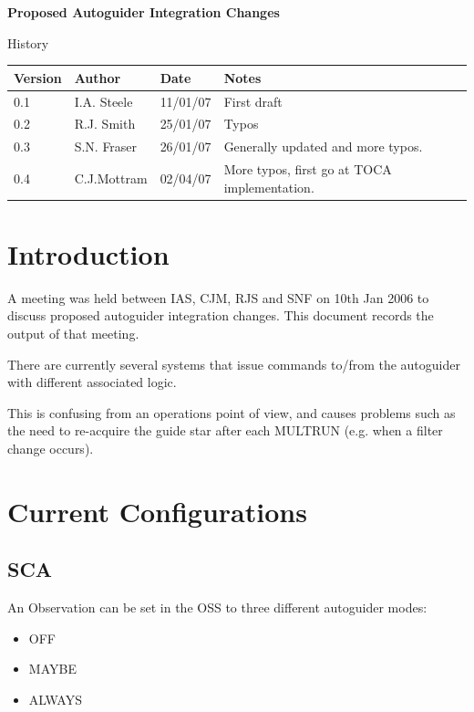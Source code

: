 \documentclass{article}
\begin{document}
\centerline{\Large{\bf Proposed Autoguider Integration Changes}}
\vspace*{0.2cm}
\centerline{\Large History}
\begin{center}
\begin{tabular}{|l|l|l|p{20em}|}
\hline
{\bf Version} & {\bf Author} & {\bf Date} & {\bf Notes} \\
\hline
0.1 & I.A. Steele & 11/01/07  & First draft \\
\hline
0.2 & R.J. Smith & 25/01/07 & Typos\\
\hline
0.3 & S.N. Fraser & 26/01/07 & Generally updated and more typos.\\
\hline
0.4 & C.J.Mottram & 02/04/07 & More typos, first go at TOCA implementation.\\
\hline
\end{tabular}
\end{center}
\newpage
\tableofcontents
\listoffigures
\listoftables

\section{Introduction}

A meeting was held between IAS, CJM, RJS and SNF on 10th Jan 2006
to discuss proposed autoguider integration changes.  This
document records the output of that meeting.

There are currently several systems that issue
commands to/from the autoguider with different
associated logic.
 
This is confusing from an operations point of view, and causes
problems such as the need to re-acquire the guide
star after each MULTRUN (e.g. when a filter change
occurs).

\section{Current Configurations}

\subsection{SCA}

An {\rm Observation} can be set in the OSS to three different
autoguider modes:

\begin{itemize}
\item OFF
\item MAYBE
\item ALWAYS
\end{itemize}
\end{document}
